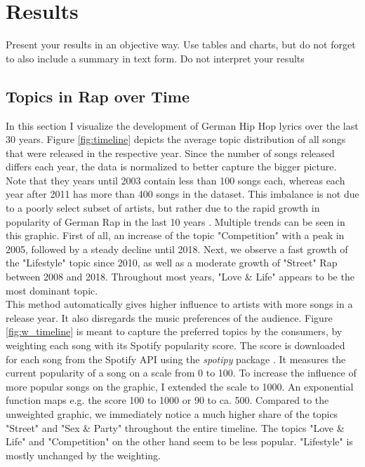 \documentclass[conference]{IEEEtran}
\begin{document}
\section{Results}
Present your results in an objective way. Use tables and charts, but do not
forget to also include a summary in text form. Do not interpret your results

\subsection{Topics in Rap over Time}
In this section I visualize the development of German Hip Hop lyrics over the last 30 years. Figure \ref{fig:timeline} depicts the average topic distribution of all songs that were released in the respective year. Since the number of songs released differs each year, the data is normalized to better capture the bigger picture. Note that they years until 2003 contain less than 100 songs each, whereas each year after 2011 has more than 400 songs in the dataset. This imbalance is not due to a poorly select subset of artists, but rather due to the rapid growth in popularity of German Rap in the last 10 years \cite{musikindustrie}. Multiple trends can be seen in this graphic. First of all, an increase of the topic "Competition" with a peak in 2005, followed by a steady decline until 2018. Next, we observe a fast growth of the "Lifestyle" topic since 2010, as well as a moderate growth of "Street" Rap between 2008 and 2018. Throughout most years, "Love \& Life" appears to be the most dominant topic.\\
This method automatically gives higher influence to artists with more songs in a release year. It also disregards the music preferences of the audience. Figure \ref{fig:w_timeline} is meant to capture the preferred topics by the consumers, by weighting each song with its Spotify popularity score. The score is downloaded for each song from the Spotify API using the \textit{spotipy} package \cite{spotipy}. It measures the current popularity of a song on a scale from 0 to 100. To increase the influence of more popular songs on the graphic, I extended the scale to 1000. An exponential function maps e.g. the score 100 to 1000 or 90 to ca. 500. Compared to the unweighted graphic, we immediately notice a much higher share of the topics "Street" and "Sex \& Party" throughout the entire timeline. The topics "Love \& Life" and "Competition" on the other hand seem to be less popular. "Lifestyle" is mostly unchanged by the weighting.
\end{document}
